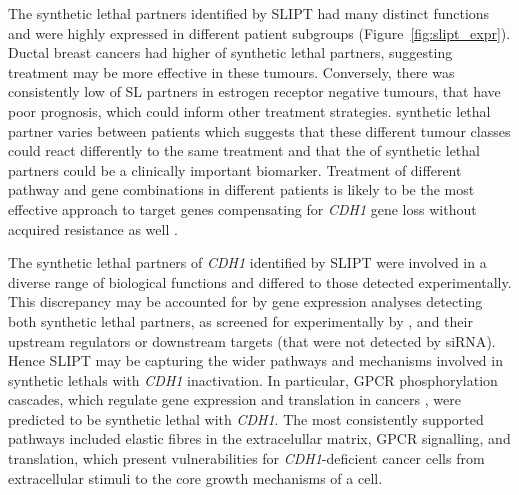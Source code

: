 The \gls{synthetic lethal} partners identified by \gls{SLIPT} had many distinct functions and were highly expressed in different patient subgroups (Figure~\ref{fig:slipt_expr}). %
Ductal breast cancers had higher  of \gls{synthetic lethal} partners, suggesting treatment may be more effective in these tumours.  Conversely, there was consistently low  of SL partners in estrogen receptor negative tumours, that have poor prognosis, which could inform other treatment strategies. %
\Gls{synthetic lethal} partner  varies between patients which suggests that these different tumour classes could react differently to the same treatment and that the  of synthetic lethal partners could be a clinically important biomarker. Treatment of different \gls{pathway} and gene combinations in different patients is likely to be the most effective approach to target genes compensating for \textit{CDH1} gene loss without acquired resistance as well \citep{Lord2014}. 

The \gls{synthetic lethal} partners of \textit{CDH1} identified by \gls{SLIPT} were involved in a diverse range of biological functions and differed to those detected experimentally. This discrepancy may be accounted for by \gls{gene expression} analyses detecting both \gls{synthetic lethal} partners, as screened for experimentally by \citet{Telford2015}, and their upstream regulators or downstream targets (that were not detected by \gls{siRNA}). Hence \gls{SLIPT} may be capturing the wider \glspl{pathway} and mechanisms involved in \glspl{synthetic lethal} with \textit{CDH1} inactivation. In particular, \gls{GPCR} phosphorylation cascades, which regulate \gls{gene expression} and translation in cancers \citep{Gao2015}, were predicted to be \gls{synthetic lethal} with \textit{CDH1}. 
The most consistently supported \glspl{pathway} included elastic fibres in the extracelullar matrix, \gls{GPCR} signalling, and translation, which present vulnerabilities for \textit{CDH1}-deficient cancer cells from extracellular stimuli to the core growth mechanisms of a cell.

